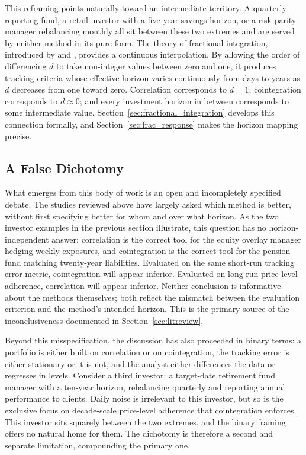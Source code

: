 \documentclass[12pt,a4paper]{article}
\begin{document}
This reframing points naturally toward an intermediate territory. A
quarterly-reporting fund, a retail investor with a five-year savings
horizon, or a risk-parity manager rebalancing monthly all sit between
these two extremes and are served by neither method in its pure form.
The theory of fractional integration, introduced by
\citet{GrangerJoyeux1980} and \citet{Hosking1981}, provides a
continuous interpolation. By allowing the order of differencing $d$ to
take non-integer values between zero and one, it produces tracking
criteria whose effective horizon varies continuously from days to years
as $d$ decreases from one toward zero. Correlation corresponds to
$d = 1$; cointegration corresponds to $d \approx 0$; and every
investment horizon in between corresponds to some intermediate value.
Section~\ref{sec:fractional_integration} develops this connection
formally, and Section~\ref{sec:frac_response} makes the horizon
mapping precise.

\subsection{A False Dichotomy}

What emerges from this body of work is an open and incompletely specified
debate. The studies reviewed above have largely asked
which method is better, without first specifying better for whom and over
what horizon. As the two investor examples in the previous section
illustrate, this question has no horizon-independent answer: correlation
is the correct tool for the equity overlay manager hedging weekly
exposures, and cointegration is the correct tool for the pension fund
matching twenty-year liabilities. Evaluated on the same short-run
tracking error metric, cointegration will appear inferior. Evaluated on
long-run price-level adherence, correlation will appear inferior. Neither
conclusion is informative about the methods themselves; both reflect the
mismatch between the evaluation criterion and the method's intended
horizon. This is the primary source of the inconclusiveness documented
in Section~\ref{sec:litreview}.

Beyond this misspecification, the discussion has also proceeded in binary
terms: a portfolio is either built on correlation or on cointegration,
the tracking error is either stationary or it is not, and the analyst
either differences the data or regresses in levels. Consider a third
investor: a target-date retirement fund manager with a ten-year horizon,
rebalancing quarterly and reporting annual performance to clients. Daily
noise is irrelevant to this investor, but so is the exclusive focus on
decade-scale price-level adherence that cointegration enforces. This
investor sits squarely between the two extremes, and the binary framing
offers no natural home for them. The dichotomy is therefore a second and
separate limitation, compounding the primary one.
\end{document}
